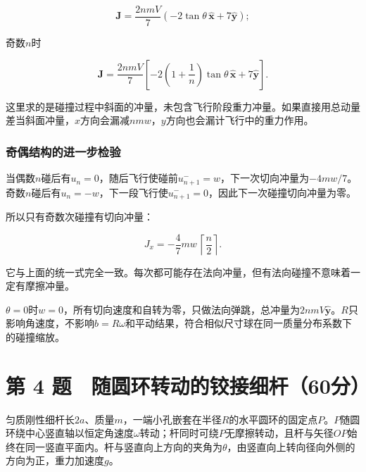 \documentclass[12pt,a4paper,fontset=fandol]{ctexart}
\begin{document}
\[
\boldsymbol J=\frac{2nmV}{7}
(-2\tan\theta\,\hat{\boldsymbol x}+7\hat{\boldsymbol y});
\]

奇数\(n\)时

\[
\boldsymbol J=\frac{2nmV}{7}
\left[-2\left(1+\frac1n\right)\tan\theta\,
\hat{\boldsymbol x}+7\hat{\boldsymbol y}\right].
\]

这里求的是碰撞过程中斜面的冲量，未包含飞行阶段重力冲量。如果直接用总动量差当斜面冲量，\(x\)方向会漏减\(nmw\)，\(y\)方向也会漏计飞行中的重力作用。

\par\noindent\begin{minipage}{\linewidth}
\subsubsection{奇偶结构的进一步检验}\label{ux5947ux5076ux7ed3ux6784ux7684ux8fdbux4e00ux6b65ux68c0ux9a8c}

当偶数\(n\)碰后有\(u_n=0\)，随后飞行使碰前\(u^-_{n+1}=w\)，下一次切向冲量为\(-4mw/7\)。奇数\(n\)碰后有\(u_n=-w\)，下一段飞行使\(u^-_{n+1}=0\)，因此下一次碰撞切向冲量为零。

所以只有奇数次碰撞有切向冲量：

\[
J_x=-\frac47mw\,\left\lceil\frac n2\right\rceil.
\]

它与上面的统一式完全一致。每次都可能存在法向冲量，但有法向碰撞不意味着一定有摩擦冲量。

\(\theta=0\)时\(w=0\)，所有切向速度和自转为零，只做法向弹跳，总冲量为\(2nmV\hat{\boldsymbol y}\)。\(R\)只影响角速度，不影响\(b=R\omega\)和平动结果，符合相似尺寸球在同一质量分布系数下的碰撞缩放。

\end{minipage}\par
\clearpage

\section{第 4
题　随圆环转动的铰接细杆（60分）}\label{ux7b2c-4-ux9898-ux968fux5706ux73afux8f6cux52a8ux7684ux94f0ux63a5ux7ec6ux674660ux5206}

匀质刚性细杆长\(2a\)、质量\(m\)，一端小孔嵌套在半径\(R\)的水平圆环的固定点\(P\)。\(P\)随圆环绕中心竖直轴以恒定角速度\(\omega\)转动；杆同时可绕\(P\)无摩擦转动，且杆与矢径\(OP\)始终在同一竖直平面内。杆与竖直向上方向的夹角为\(\theta\)，由竖直向上转向径向外侧的方向为正，重力加速度\(g\)。
\end{document}
